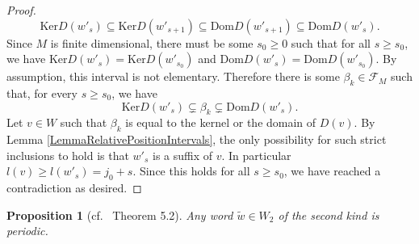 \documentclass[12pt]{amsart}
\newtheorem{proposition}[theorem]{Proposition}
\theoremstyle{definition}
\renewcommand{\tilde}{\widetilde}
\newcommand{\<}{\langle}   %
\renewcommand{\>}{\rangle} %
\begin{document}
\begin{proof}
     \begin{equation*}
         \mathrm{Ker}D(w'_s) \subseteq  \mathrm{Ker}D(w'_{s+1}) \subseteq  \mathrm{Dom} D(w'_{s+1}) \subseteq  \mathrm{Dom} D(w'_s).
     \end{equation*}
     Since $M$ is finite dimensional, there must be some $s_0 \geq 0$ such that for all $s \geq s_0$, we have $\mathrm{Ker}D(w'_s) = \mathrm{Ker}D(w'_{s_0})$ and $\mathrm{Dom} D(w'_s) = \mathrm{Dom} D(w'_{s_0})$. By assumption, this interval is not elementary. Therefore there is some $\beta_k \in \mathcal F_M$ such that, for every $s \geq s_0$, we have 
     \begin{equation*}
         \mathrm{Ker}D(w'_s) \subsetneq \beta_k \subsetneq \mathrm{Dom} D(w'_s).
     \end{equation*}
     Let $v \in W$ such that $\beta_k$ is equal to the kernel or the domain of $D(v)$. By Lemma \ref{LemmaRelativePositionIntervals}, the only possibility for such strict inclusions to hold is that $w'_s$ is a suffix of $v$. In particular $l(v) \geq l(w'_s) = j_0+s$. Since this holds for all $s\geq s_0$, we have reached a contradiction as desired.
\end{proof}

\begin{proposition}[cf.~\cite{gelfand-ponomarev:1968} Theorem 5.2]\label{WordsArePeriodic}
    Any word $\tilde w \in W_2$ of the second kind is periodic.
\end{proposition}
\end{document}
